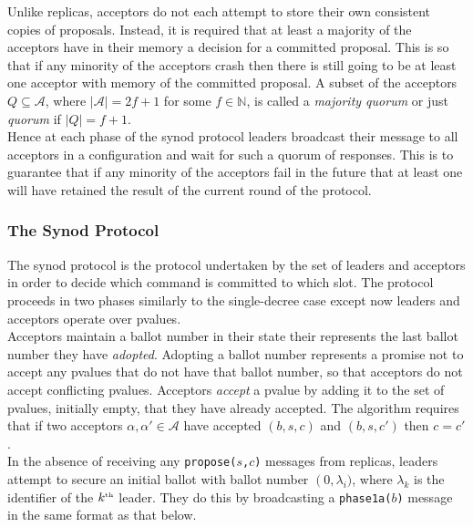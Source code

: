 

Unlike replicas, acceptors do not each attempt to store their own consistent copies of proposals. Instead, it is required that at least a majority of the acceptors have in their memory a decision for a committed proposal. This is so that if any minority of the acceptors crash then there is still going to be at least one acceptor with memory of the committed proposal. A subset of the acceptors  $Q \subseteq \mathcal{A}$, where $|\mathcal{A}| = 2f + 1$ for some $f \in \mathbb{N}$, is called a \emph{majority quorum} or just \emph{quorum} if $|Q| = f + 1$. \\

Hence at each phase of the synod protocol leaders broadcast their message to all acceptors in a configuration and wait for such a quorum of responses. This is to guarantee that if any minority of the acceptors fail in the future that at least one will have retained the result of the current round of the protocol.

\subsubsection{The Synod Protocol}

The synod protocol is the protocol undertaken by the set of leaders and acceptors in order to decide which command is committed to which slot. The protocol proceeds in two phases similarly to the single-decree case except now leaders and acceptors operate over pvalues. \\

Acceptors maintain a ballot number in their state their represents the last ballot number they have \emph{adopted}. Adopting a ballot number represents a promise not to accept any pvalues that do not have that ballot number, so that acceptors do not accept conflicting pvalues. Acceptors \emph{accept} a pvalue by adding it to the set of pvalues, initially empty, that they have already accepted. The algorithm requires that if two acceptors $\alpha, \alpha' \in \mathcal{A}$ have accepted $(b,s,c)$ and $(b,s,c')$ then $c = c'$. \\

In the absence of receiving any \texttt{propose($s$,$c$)} messages from replicas, leaders attempt to secure an initial ballot with ballot number $\left(0, \lambda_i)$, where $\lambda_k$ is the identifier of the $k^{\text{\tiny th}}$ leader. They do this by broadcasting a \texttt{phase1a($b$)} message in the same format as that below. \\

